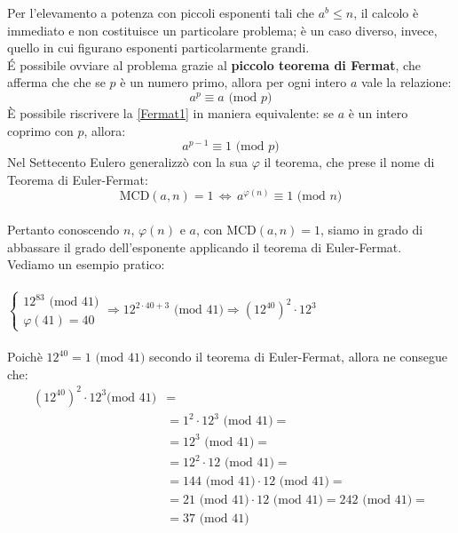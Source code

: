 Per l'elevamento a potenza con piccoli esponenti tali che $a^b \leq n$, il calcolo è immediato e non costituisce un particolare problema; è un caso diverso, invece, quello in cui figurano esponenti particolarmente grandi.\\
\'E possibile ovviare al problema grazie al \textbf{piccolo teorema di Fermat}, che afferma che che se $p$ è un numero primo, allora per ogni intero $a$ vale la relazione:
\begin{equation}\label{Fermat1}
    a^p \equiv a \text{ (mod $p$)}
\end{equation}
È possibile riscrivere la \eqref{Fermat1} in maniera equivalente: se $a$ è un intero coprimo con $p$, allora:
\begin{equation}\label{Fermat2}
    a^{p-1} \equiv 1 \text{ (mod $p$)}
\end{equation}
Nel Settecento Eulero generalizzò con la sua $\varphi$ il teorema, che prese il nome di Teorema di Euler-Fermat:
\begin{equation}\label{EulerFermat}
    \text{MCD$(a,n)=1$} \, \Longleftrightarrow \, a^{\varphi(n)} \equiv 1 \text{ (mod $n$)}
\end{equation}\\
Pertanto conoscendo $n$, $\varphi(n)$ e $a$, con MCD$(a,n)=1$, siamo in grado di abbassare il grado dell'esponente applicando il teorema di Euler-Fermat.\\
Vediamo un esempio pratico:\\\\
$\left \{ \begin{array}{lr}
12^{83} \text{ (mod $41$)}\\
\varphi(41)=40
\end{array}
\right. \Longrightarrow 12^{2 \cdot 40 + 3} \text{ (mod $41$)} \Longrightarrow \left(12^{40}\right)^2\cdot 12^3$ \\\\
Poichè $12^{40} = 1 \text{ (mod $41$)}$ secondo il teorema di Euler-Fermat, allora ne consegue che:
\begin{equation}
\begin{split}
\left(12^{40}\right)^2\cdot 12^3 \text{(mod $41$)} & =\\
& = 1^2 \cdot 12^3 \text{ (mod $41$)} =\\
& = 12^3 \text{ (mod $41$)} =\\
& = 12^2 \cdot 12 \text{ (mod $41$)} =\\
& = 144 \text{ (mod $41$)} \cdot 12 \text{ (mod $41$)} =\\
& = 21 \text{ (mod $41$)} \cdot 12 \text{ (mod $41$)} = 242 \text{ (mod $41$)} =\\
& = 37 \text{ (mod $41$)}
\end{split}
\end{equation}\\
